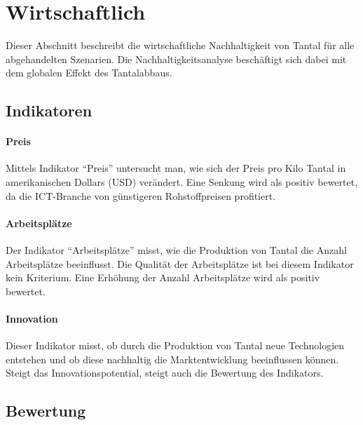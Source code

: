 
\section{Wirtschaftlich}\label{sec:conflict}

Dieser Abschnitt beschreibt die wirtschaftliche Nachhaltigkeit von Tantal für alle abgehandelten Szenarien. Die Nachhaltigkeitsanalyse beschäftigt sich dabei mit dem globalen Effekt des Tantalabbaus.

\subsection{Indikatoren}

\paragraph{Preis}
Mittels Indikator ``Preis'' untersucht man, wie sich der Preis pro Kilo Tantal
in amerikanischen Dollars (USD) verändert. Eine Senkung wird als positiv bewertet, da die ICT-Branche von günstigeren Rohstoffpreisen profitiert. 

\paragraph{Arbeitsplätze}
Der Indikator ``Arbeitsplätze'' misst, wie die Produktion von Tantal die Anzahl
Arbeitsplätze beeinflusst. Die Qualität der Arbeitsplätze ist bei diesem Indikator kein Kriterium. Eine Erhöhung der Anzahl Arbeitsplätze wird als positiv bewertet.

\paragraph{Innovation}
Dieser Indikator misst, ob durch die Produktion von Tantal neue Technologien
entstehen und ob diese nachhaltig die Marktentwicklung beeinflussen können. Steigt das Innovationspotential, steigt auch die Bewertung des Indikators.

\subsection{Bewertung}

